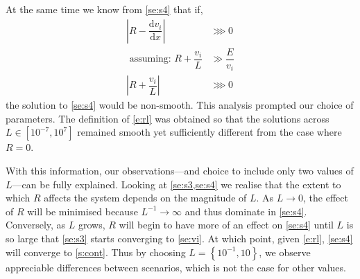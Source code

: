 \documentclass[aip,apl,reprint]{revtex4-1}
\newcommand{\difx}[1]{\dfrac{\mathrm{d}#1}{\mathrm{d}x}}
\begin{document}
	At the same time we know from \cref{se:s4} that if,
	\begin{subequations}
		\begin{align}
			\left|R - \difx{v_{i}}\right| &\ggg 0 \\
			\textrm{ assuming: } R + \dfrac{v_{i}}{L} &\gg \dfrac{E}{v_{i}} \nonumber \\
			\left|R + \dfrac{v_{i}}{L}\right| &\ggg 0
		\end{align}
	\end{subequations}
	the solution to \cref{se:s4} would be non-smooth. This analysis prompted our choice of parameters. The definition of \cref{e:rl} was obtained so that the solutions across $L \in [10^{-7}, 10^{7}]$ remained smooth yet sufficiently different from the case where $R = 0$.
	
	With this information, our observations---and choice to include only two values of $L$---can be fully explained. Looking at \cref{se:s3,se:s4} we realise that the extent to which $R$ affects the system depends on the magnitude of $L$. As $L \to 0$, the effect of $R$ will be minimised because $L^{-1} \to \infty$ and thus dominate in \cref{se:s4}. Conversely, as $L$ grows, $R$ will begin to have more of an effect on \cref{se:s4} until $L$ is so large that \cref{se:s3} starts converging to \cref{se:vi}. At which point, given \cref{e:rl}, \cref{se:s4} will converge to \cref{s:cont}. Thus by choosing $L = \left\{10^{-1}, 10\right\}$, we observe appreciable differences between scenarios, which is not the case for other values.

\end{document}
